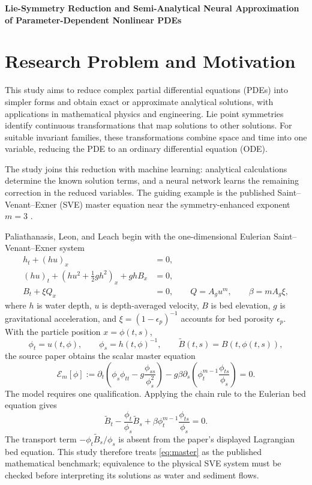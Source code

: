 \documentclass[12pt]{article}
\newcommand{\E}{\mathcal E}
\begin{document}


\begin{center}
\textbf{Lie-Symmetry Reduction and Semi-Analytical Neural Approximation\\
of Parameter-Dependent Nonlinear PDEs}\\[4pt]
\end{center}

\section{Research Problem and Motivation}

This study aims to reduce complex partial differential equations (PDEs) into simpler forms and obtain exact or approximate analytical solutions, with applications in mathematical physics and engineering. Lie point symmetries identify continuous transformations that map solutions to other solutions. For suitable invariant families, these transformations combine space and time into one variable, reducing the PDE to an ordinary differential equation (ODE).

The study joins this reduction with machine learning: analytical calculations determine the known solution terms, and a neural network learns the remaining correction in the reduced variables. The guiding example is the published Saint--Venant--Exner (SVE) master equation near the symmetry-enhanced exponent $m=3$ \cite{lagrange}.

Paliathanasis, Leon, and Leach begin with the one-dimensional Eulerian
Saint--Venant--Exner system
\begin{align}
h_t+(hu)_x&=0, \nonumber\\
(hu)_t+\left(hu^2+\tfrac12gh^2\right)_x+ghB_x&=0, \label{eq:eulerian}\\
B_t+\xi Q_x&=0,\qquad Q=A_g u^m,\qquad
\beta=mA_g\xi, \nonumber
\end{align}
where $h$ is water depth, $u$ is depth-averaged velocity, $B$ is bed
elevation, $g$ is gravitational acceleration, and $\xi=(1-\epsilon_p)^{-1}$ accounts for bed porosity $\epsilon_p$. With the particle position $x=\phi(t,s)$,
\[
\phi_t=u(t,\phi),\qquad \phi_s=h(t,\phi)^{-1},
\qquad \widetilde B(t,s)=B(t,\phi(t,s)),
\]
the source paper obtains the scalar master equation
\begin{equation}
\E_m[\phi]:=
\partial_t\left(\phi_s\phi_{tt}-g\frac{\phi_{ss}}{\phi_s^2}\right)
-g\beta\partial_s\left(\phi_t^{m-1}\frac{\phi_{ts}}{\phi_s}\right)=0.
\label{eq:master}
\end{equation}
The model requires one qualification. Applying the chain rule to the Eulerian bed equation gives
\begin{equation}
\widetilde B_t-\frac{\phi_t}{\phi_s}\widetilde B_s
+\beta\phi_t^{m-1}\frac{\phi_{ts}}{\phi_s}=0.
\label{eq:lag-exner-audit}
\end{equation}
The transport term $-\phi_t\widetilde B_s/\phi_s$ is absent from the paper's displayed Lagrangian bed equation. This study therefore treats \eqref{eq:master} as the published mathematical benchmark; equivalence to the physical SVE system must be checked before interpreting its solutions as water and sediment flows.
\end{document}
